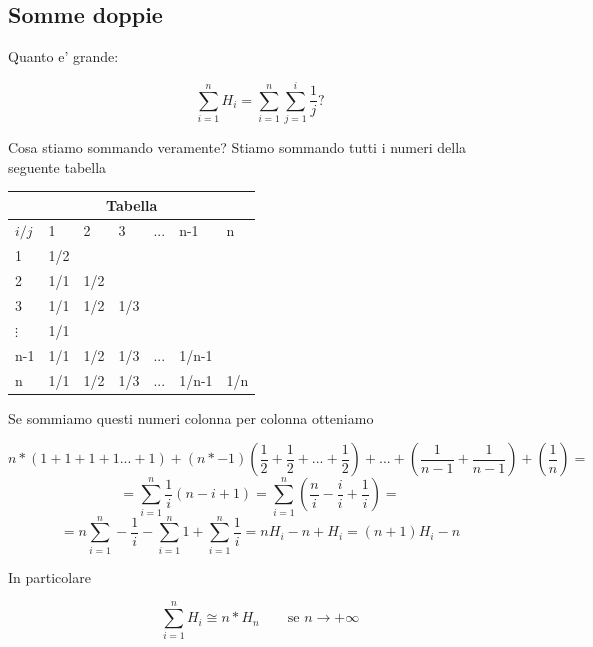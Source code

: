 \documentclass{article}
\begin{document}
        \subsection{Somme doppie}
        \begin{flushleft}
          Quanto e' grande:
        \end{flushleft}
        \begin{equation*}
          \sum^n_{i=1} H_i = \sum^n_{i=1} \sum_{j=1}^i \frac{1}{j}?
        \end{equation*}
        \begin{flushleft}
          Cosa stiamo sommando veramente? Stiamo sommando tutti i numeri della seguente tabella 
        \end{flushleft}
        \begin{tabular}{ |p{1cm}||p{1cm}||p{1cm}||p{1cm}||p{1cm}||p{1cm}||p{1cm}|  }
          \hline
            \multicolumn{7}{|c|}{Tabella} \\
          \hline
            $i/j$& 1& 2& 3& ...& n-1& n \\
          \hline
            1& 1/2& & & & &\\
            2& 1/1& 1/2& & & &\\
            3& 1/1& 1/2& 1/3 & & &\\
            $\vdots$& 1/1& & & & &  \\
            n-1& 1/1& 1/2& 1/3& ...& 1/n-1& \\
            n& 1/1& 1/2& 1/3& ...& 1/n-1& 1/n\\
          \hline
        \end{tabular}
        \begin{flushleft}
          Se sommiamo questi numeri colonna per colonna otteniamo
        \end{flushleft}
        \begin{equation*}
          n*(1+1+1+1...+1)+(n*-1)(\frac{1}{2}+\frac{1}{2}+...+\frac{1}{2})+...+(\frac{1}{n-1}+\frac{1}{n-1})+(\frac{1}{n})=
        \end{equation*}
        \begin{equation*}
          = \sum_{i=1}^n \frac{1}{i}(n-i+1)= \sum^n_{i=1} (\frac{n}{i}-\frac{i}{i}+\frac{1}{i})=
        \end{equation*}
        \begin{equation*}
          = n  \sum_{i=1}^n -\frac{1}{i}-\sum_{i=1}^n 1+ \sum_{i=1}^n \frac{1}{i} = nH_i -n +H_i=(n+1)H_i -n
        \end{equation*}
        \begin{flushleft}
          In particolare
        \end{flushleft}
        \begin{equation*}
          \sum^n_{i=1} H_i \cong n*H_n \quad \quad \text{se $n\to +\infty$}
        \end{equation*}
\end{document}
